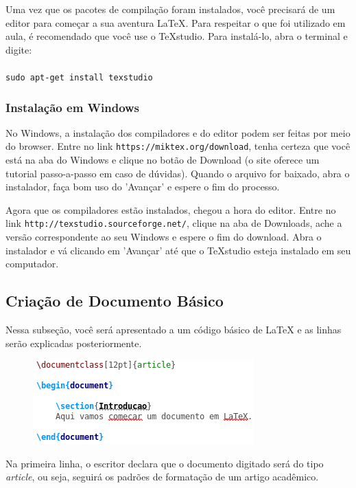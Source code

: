 \documentclass[12pt]{article}
\begin{document}
			Uma vez que os pacotes de compilação foram instalados, você precisará de um editor para começar a sua aventura LaTeX. Para respeitar o que foi utilizado em aula, é recomendado que você use o TeXstudio. Para instalá-lo, abra o terminal e digite:\\\\
			\texttt{sudo apt-get install texstudio}
			
			\subsubsection{Instalação em Windows}
			No Windows, a instalação dos compiladores e do editor podem ser feitas por meio do browser. Entre no link \texttt{https://miktex.org/download}, tenha certeza que você está na aba do Windows e clique no botão de Download (o site oferece um tutorial passo-a-passo em caso de dúvidas). Quando o arquivo for baixado, abra o instalador, faça bom uso do 'Avançar' e espere o fim do processo.
			
			Agora que os compiladores estão instalados, chegou a hora do editor. Entre no link \texttt{http://texstudio.sourceforge.net/}, clique na aba de Downloads, ache a versão correspondente ao seu Windows e espere o fim do download. Abra o instalador e vá clicando em 'Avançar' até que o TeXstudio esteja instalado em seu computador.
			
		\subsection{Criação de Documento Básico}
		
			Nessa subseção, você será apresentado a um código básico de LaTeX e as linhas serão explicadas posteriormente.
			
			\begin{figure}[h]
				\begin{center}
					\includegraphics{codigo1.png}
				\end{center}
			\end{figure}
		
		    Na primeira linha, o escritor declara que o documento digitado será do tipo \textit{article}, ou seja, seguirá os padrões de formatação de um artigo acadêmico.
			
			
			
		
	
\end{document}
